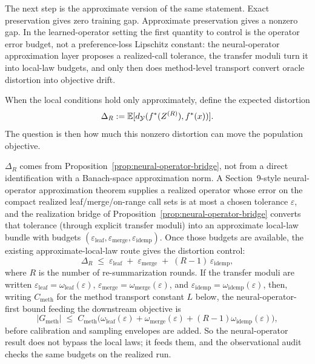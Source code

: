 The next step is the approximate version of the same statement. Exact preservation gives zero training gap. Approximate preservation gives a nonzero gap. In the learned-operator setting the first quantity to control is the operator error budget, not a preference-loss Lipschitz constant: the neural-operator approximation layer proposes a realized-call tolerance, the transfer moduli turn it into local-law budgets, and only then does method-level transport convert oracle distortion into objective drift.

When the local conditions hold only approximately, define the expected distortion
\[
\Delta_R := \mathbb{E}[d_{\mathcal{Y}}(f^\ast(Z^{(R)}), f^\ast(x))].
\]
The question is then how much this nonzero distortion can move the population objective.

$\Delta_R$ comes from Proposition~\ref{prop:neural-operator-bridge},
not from a direct identification with a Banach-space approximation
norm. A Section~9-style
neural-operator approximation theorem supplies a realized operator whose
error on the compact realized leaf/merge/on-range call sets is at most a
chosen tolerance $\varepsilon$, and the realization bridge of
Proposition~\ref{prop:neural-operator-bridge} converts that
tolerance (through explicit transfer moduli) into an approximate
local-law bundle with budgets
$(\varepsilon_{\mathrm{leaf}}, \varepsilon_{\mathrm{merge}},
\varepsilon_{\mathrm{idemp}})$. Once those budgets are available, the
existing approximate-local-law route gives the distortion control:
\[
\Delta_R \;\le\;
\varepsilon_{\mathrm{leaf}}
\;+\;
\varepsilon_{\mathrm{merge}}
\;+\;
(R-1)\,\varepsilon_{\mathrm{idemp}},
\]
where $R$ is the number of re-summarization rounds. If the transfer
moduli are written
$\varepsilon_{\mathrm{leaf}}=\omega_{\mathrm{leaf}}(\varepsilon)$,
$\varepsilon_{\mathrm{merge}}=\omega_{\mathrm{merge}}(\varepsilon)$, and
$\varepsilon_{\mathrm{idemp}}=\omega_{\mathrm{idemp}}(\varepsilon)$,
then, writing $C_{\mathrm{meth}}$ for the method transport constant $L$
below, the neural-operator-first bound feeding the downstream objective is
\[
|G_{\mathrm{meth}}|
\;\le\;
C_{\mathrm{meth}}\Big(
\omega_{\mathrm{leaf}}(\varepsilon)
+\omega_{\mathrm{merge}}(\varepsilon)
+(R-1)\omega_{\mathrm{idemp}}(\varepsilon)
\Big),
\]
before calibration and sampling envelopes are added. So the
neural-operator result does not bypass the local laws; it feeds them,
and the observational audit checks the same budgets on the realized run.

